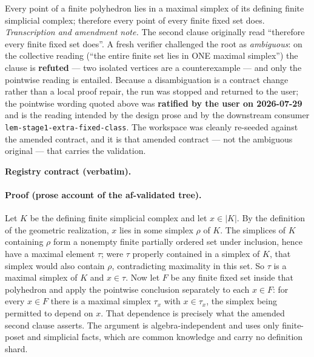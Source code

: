 \begin{lemma}\label{lem:finite-polyhedron-maximal-simplex-placement}
Every point of a finite polyhedron lies in a maximal simplex of its defining finite
simplicial complex; therefore every point of every finite fixed set does.
\emph{Transcription and amendment note.} The second clause originally read ``therefore every
finite fixed set does''. A fresh verifier challenged the root as \emph{ambiguous}: on the
collective reading (``the entire finite set lies in ONE maximal simplex'') the clause is
\textbf{refuted} --- two isolated vertices are a counterexample --- and only the pointwise
reading is entailed. Because a disambiguation is a contract change rather than a local proof
repair, the run was stopped and returned to the user; the pointwise wording quoted above was
\textbf{ratified by the user on 2026-07-29} and is the reading intended by the design prose
and by the downstream consumer \texttt{lem-stage1-extra-fixed-class}. The workspace was
cleanly re-seeded against the amended contract, and it is that amended contract --- not the
ambiguous original --- that carries the validation.
\end{lemma}

\noindent\textbf{Registry contract (verbatim).}

\paragraph{Proof (prose account of the af-validated tree).}
Let $K$ be the defining finite simplicial complex and let $x\in|K|$. By the definition of
the geometric realization, $x$ lies in some simplex $\rho$ of $K$. The simplices of $K$
containing $\rho$ form a nonempty finite partially ordered set under inclusion, hence
have a maximal element $\tau$; were $\tau$ properly contained in a simplex of $K$, that
simplex would also contain $\rho$, contradicting maximality in this set. So $\tau$ is a
maximal simplex of $K$ and $x\in\tau$. Now let $F$ be any finite fixed set inside that
polyhedron and apply the pointwise conclusion separately to each $x\in F$: for every $x\in F$
there is a maximal simplex $\tau_x$ with $x\in\tau_x$, the simplex being permitted to depend
on $x$. That dependence is precisely what the amended second clause asserts. The argument is
algebra-independent and uses only finite-poset and simplicial facts, which are common
knowledge and carry no definition shard.

